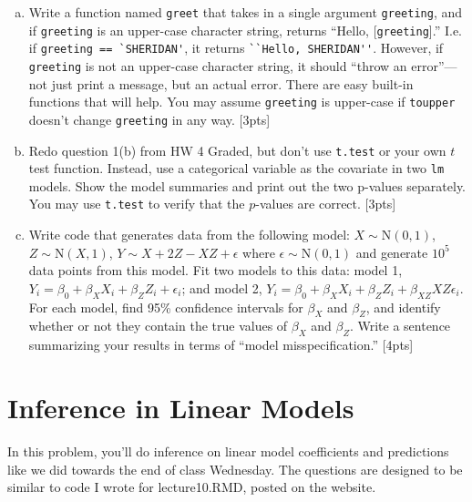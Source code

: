 \documentclass[12pt]{article}
\newcommand{\Norm}{\text{N}}
\begin{document}
\begin{enumerate}[(a)]
	\item Write a function named \verb|greet| that takes in a single argument \verb|greeting|, and if \verb|greeting| is an upper-case character string, returns ``Hello, [\verb|greeting|].'' I.e. if \verb|greeting == `SHERIDAN'|, it returns \verb|``Hello, SHERIDAN''|. However, if \verb|greeting| is not an upper-case character string, it should ``throw an error''---not just print a message, but an actual error. There are easy built-in functions that will help. You may assume \verb|greeting| is upper-case if \verb|toupper| doesn't change \verb|greeting| in any way. [3pts]
	\item Redo question 1(b) from HW 4 Graded, but don't use \verb|t.test| or your own $t$ test function. Instead, use a categorical variable as the covariate in two \verb|lm| models. Show the model summaries and print out the two p-values separately. You may use \verb|t.test| to verify that the $p$-values are correct. [3pts]
	\item Write code that generates data from the following model: $X \sim \Norm(0,1)$, $Z \sim \Norm(X,1)$, $Y \sim X + 2Z - XZ + \epsilon$ where $\epsilon \sim \Norm(0,1)$ and generate $10^5$ data points from this model. Fit two models to this data: model 1, $Y_i = \beta_0 + \beta_X X_i + \beta_Z Z_i + \epsilon_i$; and model 2, $Y_i = \beta_0 + \beta_X X_i + \beta_Z Z_i + \beta_{XZ} XZ \epsilon_i$. For each model, find 95\% confidence intervals for $\beta_X$ and $\beta_Z$, and identify whether or not they contain the true values of $\beta_X$ and $\beta_Z$. Write a sentence summarizing your results in terms of ``model misspecification.'' [4pts]
\end{enumerate}

\section{Inference in Linear Models}

In this problem, you'll do inference on linear model coefficients and predictions like we did towards the end of class Wednesday. The questions are designed to be similar to code I wrote for lecture10.RMD, posted on the website.
\end{document}
